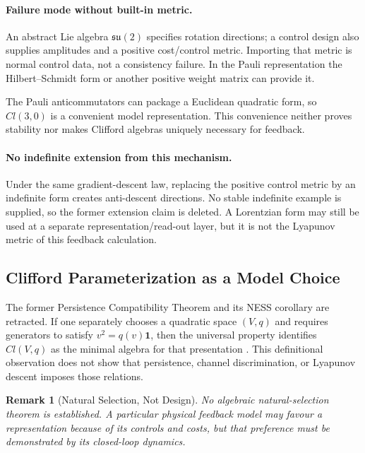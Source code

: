 \documentclass[aps,pre,onecolumn,superscriptaddress,floatfix,longbibliography]{revtex4-2}
\newtheorem{remark}[theorem]{Remark}
\begin{document}
\paragraph{Failure mode without built-in metric.}
An abstract Lie algebra $\mathfrak{su}(2)$ specifies rotation directions; a control design also supplies amplitudes and a positive cost/control metric.  Importing that metric is normal control data, not a consistency failure.  In the Pauli representation the Hilbert--Schmidt form or another positive weight matrix can provide it.

The Pauli anticommutators can package a Euclidean quadratic form, so $Cl(3,0)$ is a convenient model representation.  This convenience neither proves stability nor makes Clifford algebras uniquely necessary for feedback.

\paragraph{No indefinite extension from this mechanism.}
Under the same gradient-descent law, replacing the positive control metric by an indefinite form creates anti-descent directions.  No stable indefinite example is supplied, so the former extension claim is deleted.  A Lorentzian form may still be used at a separate representation/read-out layer, but it is not the Lyapunov metric of this feedback calculation.

\subsection{Clifford Parameterization as a Model Choice}

The former Persistence Compatibility Theorem and its NESS corollary are retracted.  If one separately chooses a quadratic space $(V,q)$ and requires generators to satisfy $v^2=q(v)\mathbf1$, then the universal property identifies $Cl(V,q)$ as the minimal algebra for that presentation \cite{Hestenes1966}.  This definitional observation does not show that persistence, channel discrimination, or Lyapunov descent imposes those relations.

\begin{remark}[Natural Selection, Not Design]
No algebraic natural-selection theorem is established.  A particular physical feedback model may favour a representation because of its controls and costs, but that preference must be demonstrated by its closed-loop dynamics.
\end{remark}
\end{document}
